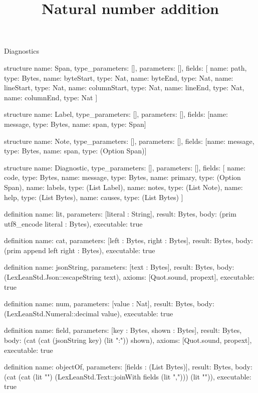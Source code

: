 \begin{lexlean}{Diagnostics}
\title{Natural number addition}
\begin{semanticmodule}
structure{
  name: Span,
  type_parameters: [],
  parameters: [],
  fields: [
    {name: path, type: Bytes},
    {name: byteStart, type: Nat},
    {name: byteEnd, type: Nat},
    {name: lineStart, type: Nat},
    {name: columnStart, type: Nat},
    {name: lineEnd, type: Nat},
    {name: columnEnd, type: Nat}
  ]
}

structure{
  name: Label,
  type_parameters: [],
  parameters: [],
  fields: [{name: message, type: Bytes}, {name: span, type: Span}]
}

structure{
  name: Note,
  type_parameters: [],
  parameters: [],
  fields: [{name: message, type: Bytes}, {name: span, type: (Option Span)}]
}

structure{
  name: Diagnostic,
  type_parameters: [],
  parameters: [],
  fields: [
    {name: code, type: Bytes},
    {name: message, type: Bytes},
    {name: primary, type: (Option Span)},
    {name: labels, type: (List Label)},
    {name: notes, type: (List Note)},
    {name: help, type: (List Bytes)},
    {name: causes, type: (List Bytes)}
  ]
}

definition{
  name: lit,
  parameters: [literal : String],
  result: Bytes,
  body: (prim utf8_encode literal : Bytes),
  executable: true
}

definition{
  name: cat,
  parameters: [left : Bytes, right : Bytes],
  result: Bytes,
  body: (prim append left right : Bytes),
  executable: true
}

definition{
  name: jsonString,
  parameters: [text : Bytes],
  result: Bytes,
  body: (LexLeanStd.Json::escapeString text),
  axioms: [Quot.sound, propext],
  executable: true
}

definition{
  name: num,
  parameters: [value : Nat],
  result: Bytes,
  body: (LexLeanStd.Numeral::decimal value),
  executable: true
}

definition{
  name: field,
  parameters: [key : Bytes, shown : Bytes],
  result: Bytes,
  body: (cat (cat (jsonString key) (lit ":")) shown),
  axioms: [Quot.sound, propext],
  executable: true
}

definition{
  name: objectOf,
  parameters: [fields : (List Bytes)],
  result: Bytes,
  body: (cat (cat (lit "{") (LexLeanStd.Text::joinWith fields (lit ","))) (lit "}")),
  executable: true
}


\end{semanticmodule}
\end{lexlean}
